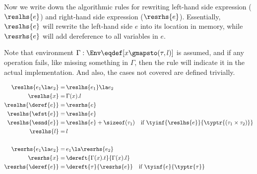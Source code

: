Now we write down the algorithmic rules  for rewriting left-hand side expression ($\reslhs{e}$)
and right-hand side expression ($\resrhs{e}$). Essentially, $\reslhs{e}$ will rewrite the left-hand side $e$ into its location
in memory, while $\resrhs{e}$ will add dereference to all variables in $e$.

Note that environment $\Gamma : \Env \eqdef [x \gmapsto (\tau, l)]$ is assumed, and if any operation fails, like missing something in $\Gamma$,
then the rule will indicate it in the actual implementation.
And also, the cases not covered are defined trivially.

\begin{align*}\label{envrules}
\reslhs{e_1 \la e_2} =&\, \reslhs{e_1} \la e_2\\
\reslhs{x} =&\, \Gamma(x).l \\
\reslhs{\deref{e}} =&\, \resrhs{e} \\
\reslhs{\efst{e}} =&\, \reslhs{e} \\
\reslhs{\esnd{e}} =&\, \reslhs{e} + \sizeof(\tau_1) \quad \text{if } \tyinf{\reslhs{e}}{\typtr{(\tau_1 \times \tau_2)}}\\
\reslhs{l} =&\, l\\
\\
\resrhs{e_1 \la e_2} =&\, e_1 \la \resrhs{e_2}\\
\resrhs{x} =&\, \dereft{\Gamma(x).t}{\Gamma(x).l} \\
\resrhs{\deref{e}} =&\, \dereft{\tau}{\resrhs{e}} \quad \text{if } \tyinf{e}{\typtr{\tau}}
\end{align*}

